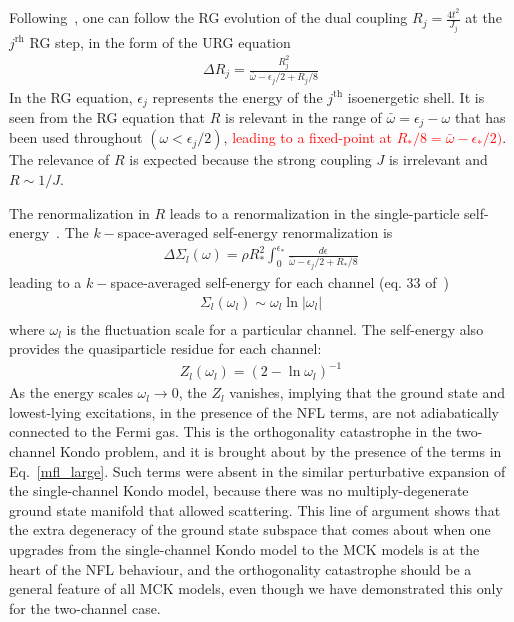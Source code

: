 \documentclass[12pt]{revtex4-2}
\begin{document}
Following~\cite{anirbanmott1}, one can follow the RG evolution of the dual coupling \(R_j = \frac{4t^2}{J_j}\) at the \(j^\text{rh}\) RG step, in the form of the URG equation
\begin{equation}\begin{aligned}
	\Delta R_j = \frac{R_j^2}{\bar\omega - \epsilon_{j}/2 + R_j/8}
\end{aligned}\end{equation}
In the RG equation, \(\epsilon_{j}\) represents the energy of the \(j^\text{th}\) isoenergetic shell. It is seen from the RG equation that \(R\) is relevant in the range of \(\bar\omega = \epsilon_j -\omega\) that has been used throughout \((\omega < \epsilon_j/2)\), \textcolor{red}{leading to a fixed-point at \(R_*/8 = \bar\omega - \epsilon_*/2)\)}. The relevance of \(R\) is expected because the strong coupling \(J\) is irrelevant and \(R \sim 1/J\).

The renormalization in \(R\) leads to a renormalization in the single-particle self-energy~\cite{anirbanmott1}. The \(k-\)space-averaged self-energy renormalization is
\begin{equation}\begin{aligned}
	\Delta \Sigma_l(\omega) = \rho R_*^2\int_0^{\epsilon_*} \frac{d\epsilon}{\bar\omega - \epsilon_j/2 + R_*/8}
\end{aligned}\end{equation}
leading to a \(k-\)space-averaged self-energy for each channel (eq. 33 of~\cite{anirbanmott1})
\begin{equation}\begin{aligned}
	\label{self_energy}
	\Sigma_l(\omega_l) \sim \omega_l \ln |\omega_l|\\
\end{aligned}\end{equation}
where \(\omega_l\) is the fluctuation scale for a particular channel. The self-energy also provides the quasiparticle residue for each channel\cite{anirbanmott1}:
\begin{equation}\begin{aligned}
	Z_l(\omega_l) = \left(2 - \ln \omega_l\right) ^{-1}
\end{aligned}\end{equation}
As the energy scales \(\omega_l \to 0\), the \(Z_l\) vanishes, implying that the ground state and lowest-lying excitations, in the presence of the NFL terms, are not adiabatically connected to the Fermi gas. This is the orthogonality catastrophe in the two-channel Kondo problem, and it is brought about by the presence of the terms in Eq.~\ref{mfl_large}. Such terms were absent in the similar perturbative expansion of the single-channel Kondo model, because there was no multiply-degenerate ground state manifold that allowed scattering. This line of argument shows that the extra degeneracy of the ground state subspace that comes about when one upgrades from the single-channel Kondo model to the MCK models is at the heart of the NFL behaviour, and the orthogonality catastrophe should be a general feature of all MCK models, even though we have demonstrated this only for the two-channel case.
\end{document}
